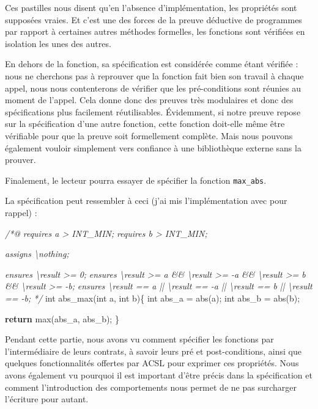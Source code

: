 \documentclass[12pt,francais,]{scrbook}
\newenvironment{Shaded}{}{}
\newcommand{\KeywordTok}[1]{\textcolor[rgb]{0.00,0.44,0.13}{\textbf{{#1}}}}
\newcommand{\DataTypeTok}[1]{\textcolor[rgb]{0.56,0.13,0.00}{{#1}}}
\newcommand{\CommentTok}[1]{\textcolor[rgb]{0.38,0.63,0.69}{\textit{{#1}}}}
\newcommand{\NormalTok}[1]{{#1}}
\begin{document}
Ces pastilles nous disent qu'en l'absence d'implémentation, les
propriétés sont supposées vraies. Et c'est une des forces de la preuve
déductive de programmes par rapport à certaines autres méthodes
formelles, les fonctions sont vérifiées en isolation les unes des
autres.

En dehors de la fonction, sa spécification est considérée comme étant
vérifiée : nous ne cherchons pas à reprouver que la fonction fait bien
son travail à chaque appel, nous nous contenterons de vérifier que les
pré-conditions sont réunies au moment de l'appel. Cela donne donc des
preuves très modulaires et donc des spécifications plus facilement
réutilisables. Évidemment, si notre preuve repose sur la spécification
d'une autre fonction, cette fonction doit-elle même être vérifiable pour
que la preuve soit formellement complète. Mais nous pouvons également
vouloir simplement vers confiance à une bibliothèque externe sans la
prouver.

Finalement, le lecteur pourra essayer de spécifier la fonction
\texttt{max\_abs}.

La spécification peut ressembler à ceci (j'ai mis l'implémentation avec
pour rappel) :

\begin{footnotesize}\begin{Shaded}
\begin{Highlighting}[]
\CommentTok{/*@}
\CommentTok{  requires a > INT_MIN;}
\CommentTok{  requires b > INT_MIN;}

\CommentTok{  assigns \textbackslash{}nothing;}

\CommentTok{  ensures \textbackslash{}result >= 0;}
\CommentTok{  ensures \textbackslash{}result >= a && \textbackslash{}result >= -a && \textbackslash{}result >= b && \textbackslash{}result >= -b;}
\CommentTok{  ensures \textbackslash{}result == a || \textbackslash{}result == -a || \textbackslash{}result == b || \textbackslash{}result == -b;}
\CommentTok{*/}
\DataTypeTok{int} \NormalTok{abs_max(}\DataTypeTok{int} \NormalTok{a, }\DataTypeTok{int} \NormalTok{b)\{}
  \DataTypeTok{int} \NormalTok{abs_a = abs(a);}
  \DataTypeTok{int} \NormalTok{abs_b = abs(b);}

  \KeywordTok{return} \NormalTok{max(abs_a, abs_b);}
\NormalTok{\}}
\end{Highlighting}
\end{Shaded}\end{footnotesize}

Pendant cette partie, nous avons vu comment spécifier les fonctions par
l'intermédiaire de leurs contrats, à savoir leurs pré et
post-conditions, ainsi que quelques fonctionnalités offertes par ACSL
pour exprimer ces propriétés. Nous avons également vu pourquoi il est
important d'être précis dans la spécification et comment l'introduction
des comportements nous permet de ne pas surcharger l'écriture pour
autant.
\end{document}
